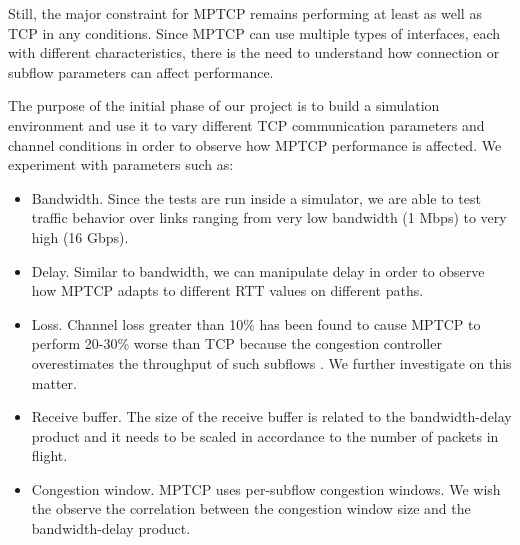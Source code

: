 Still, the major constraint for MPTCP remains performing at least as well as TCP in any conditions. Since MPTCP can use multiple types of interfaces, each with different characteristics, there is the need to understand how connection or subflow parameters can affect performance.

The purpose of the initial phase of our project is to build a simulation environment and use it to vary different TCP communication parameters and channel conditions in order to observe how MPTCP performance is affected. We experiment with parameters such as:
\begin{itemize}
\item Bandwidth. Since the tests are run inside a simulator, we are able to test traffic behavior over links ranging from very low bandwidth (1 Mbps) to very high (16 Gbps).
\item Delay. Similar to bandwidth, we can manipulate delay in order to observe how MPTCP adapts to different RTT values on different paths.
\item Loss. Channel loss greater than 10\% has been found to cause MPTCP to
perform 20-30\% worse than TCP because the congestion controller overestimates
the throughput of such subflows \cite{how-hard-can-it-be}. We further investigate on this matter.
\item Receive buffer. The size of the receive buffer is related to the bandwidth-delay product and it needs to be scaled in accordance to the number of packets in flight.
\item Congestion window. MPTCP uses per-subflow congestion windows. We wish the observe the correlation between the congestion window size and the bandwidth-delay product.
\end{itemize}

